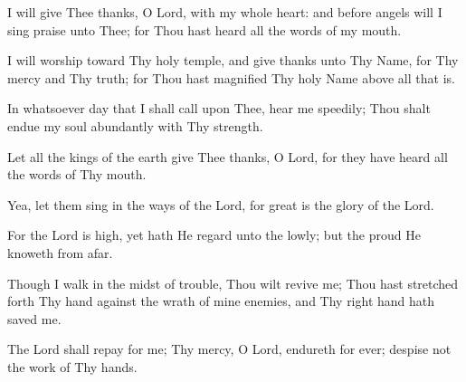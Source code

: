 I will give Thee thanks, O Lord, with my whole heart: and before angels will I sing praise unto Thee; for Thou hast heard all the words of my mouth.

I will worship toward Thy holy temple, and give thanks unto Thy Name, for Thy mercy and Thy truth; for Thou hast magnified Thy holy Name above all that is.

In whatsoever day that I shall call upon Thee, hear me speedily; Thou shalt endue my soul abundantly with Thy strength.

Let all the kings of the earth give Thee thanks, O Lord, for they have heard all the words of Thy mouth.

Yea, let them sing in the ways of the Lord, for great is the glory of the Lord.

For the Lord is high, yet hath He regard unto the lowly; but the proud He knoweth from afar.

Though I walk in the midst of trouble, Thou wilt revive me; Thou hast stretched forth Thy hand against the wrath of mine enemies, and Thy right hand hath saved me.

The Lord shall repay for me; Thy mercy, O Lord, endureth for ever; despise not the work of Thy hands.

